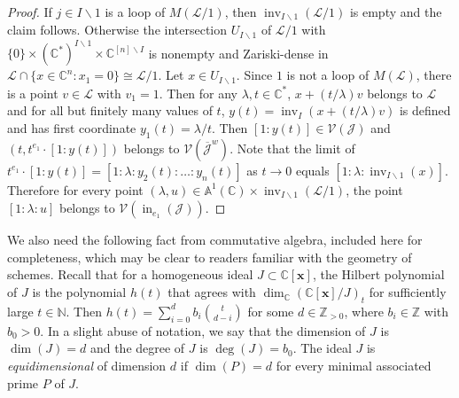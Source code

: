 \documentclass[ALCO,ThmDefs,Unicode,epreuves]{cedram}
\newcommand{\N}{\mathbb{N}}
\newcommand{\Z}{\mathbb{Z}}
\newcommand{\Cbb}{\mathbb{C}}
\newcommand{\V}{\mathcal{V}}
\newcommand{\J}{\mathcal{J}}
\newcommand{\cL}{\mathcal{L}}
\newcommand{\x}{\mathbf{x}}
\newcommand{\ol}{\overline}
\DeclareMathOperator{\In}{in}
\DeclareMathOperator{\inv}{inv}
\begin{document}
\begin{proof}
If $j\in I\backslash 1$ is a loop of $M(\cL/1)$, then $\inv_{I\backslash 1}(\cL/1)$ is empty and 
the claim follows. Otherwise the intersection $U_{I\backslash 1}$ of $\cL/1$ with $\{0\}\times (\Cbb^*)^{I\backslash 1} \times \Cbb^{[n]\backslash I}$ is nonempty and Zariski-dense in $\cL\cap \{x\in \Cbb^n: x_1=0\} \cong \cL/1$. 
Let $x \in U_{I\backslash 1}$. Since $1$ is not a loop of $M(\cL)$, 
there is a point $v \in \cL$ with $v_1 = 1$. Then for any $\lambda, t\in \Cbb^*$,
$x+ (t/\lambda)v$ belongs to $\cL$ and for all but finitely many values of $t$, $y(t) = \inv_I(x+ (t/\lambda)v)$
is defined and has first coordinate $y_1(t) = \lambda/t$. 
Then $[1: y(t)] \in \V(\J)$ and $(t, t^{e_1}\cdot [1:y(t)])$ belongs to $\V\left(\ol{\J}^w\right)$. 
Note that the limit of $t^{e_1}\cdot [1:y(t)] = [1:\lambda : y_2(t): \ldots :y_n(t)]$ as $t\rightarrow 0$ equals $[1:\lambda: \inv_{I\backslash 1}(x)]$. 
Therefore for every point $(\lambda,u)\in \mathbb{A}^1(\Cbb)\times \inv_{I\backslash 1}(\cL/1)$, the point $[1:\lambda: u]$ belongs to $\V\left(\In_{e_1}(\J)\right)$. \end{proof}


We also need the following fact from commutative algebra, included here for completeness, 
which may be clear to readers familiar with the geometry of schemes. 
Recall that for a homogeneous ideal $J \subset \Cbb[\x]$, the Hilbert polynomial of $J$ is 
the polynomial $h(t)$ that agrees with $\dim_\Cbb(\Cbb[\x]/J)_t$ for sufficiently large $t \in \N$. 
Then $ h(t) = \sum_{i=0}^d b_i \binom{t}{d-i}$ for some $d\in \Z_{>0}$, where $b_i\in \Z$ with $b_0>0$.
In a slight abuse of notation, we say that the dimension of $J$ is $\dim(J) = d$ and the degree of $J$ is $\deg(J) = b_0$. 
The ideal $J$ is \emph{equidimensional} of dimension $d$ if $\dim(P)=d$ for every minimal associated prime $P$ of $J$. 
\end{document}
